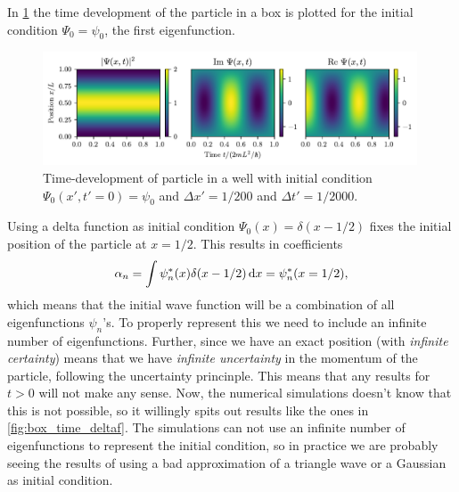 In \cref{fig:box_time_psi0} the time development of the particle in a box is plotted for the initial condition $\Psi_0 = \psi_0$, the first eigenfunction.

\begin{figure}[ht!]%
\centering%
\includegraphics[width=0.99\textwidth]{figs/box_psi0.pdf}%
\caption{Time-development of particle in a well with initial condition $\Psi_0(x',t'=0) = \psi_0$ and $\Delta x' = 1/200$ and $\Delta t' = 1/2000$. \label{fig:box_time_psi0}}%
\end{figure}

Using a delta function as initial condition $\Psi_0(x) = \delta(x - 1/2)$ fixes the initial position of the particle at $x=1/2$. This results in coefficients
\begin{equation}
    \alpha_n = \int \psi_n^{*}(x)\delta(x - 1/2) \mathop{}\!\mathrm{d} x = \psi_n^{*}(x=1/2),
\end{equation}
which means that the initial wave function will be a combination of all eigenfunctions $\psi_n$'s. To properly represent this we need to include an infinite number of eigenfunctions. Further, since we have an exact position (with \emph{infinite certainty}) means that we have \emph{infinite uncertainty} in the momentum of the particle, following the uncertainty princinple. This means that any results for $t>0$ will not make any sense. Now, the numerical simulations doesn't know that this is not possible, so it willingly spits out results like the ones in \cref{fig:box_time_deltaf}. The simulations can not use an infinite number of eigenfunctions to represent the initial condition, so in practice we are probably seeing the results of using a bad approximation of a triangle wave or a Gaussian as initial condition.


